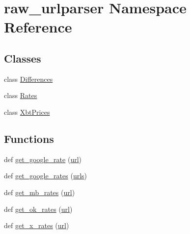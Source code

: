 \hypertarget{namespaceraw__urlparser}{}\section{raw\+\_\+urlparser Namespace Reference}
\label{namespaceraw__urlparser}
\subsection*{Classes}
\begin{DoxyCompactItemize}
\item 
class \hyperlink{classraw__urlparser_1_1_differences}{Differences}
\item 
class \hyperlink{classraw__urlparser_1_1_rates}{Rates}
\item 
class \hyperlink{classraw__urlparser_1_1_xbt_prices}{Xbt\+Prices}
\end{DoxyCompactItemize}
\subsection*{Functions}
\begin{DoxyCompactItemize}
\item 
def \hyperlink{namespaceraw__urlparser_a4faaced9140d84b3f953c21eb1c4a19d}{get\+\_\+google\+\_\+rate} (\hyperlink{namespaceraw__urlparser_a9242b893f4f49ef7cc0d4e599b70daa4}{url})
\item 
def \hyperlink{namespaceraw__urlparser_aa5905f1b040de4865980526ac3c6a16c}{get\+\_\+google\+\_\+rates} (\hyperlink{namespaceraw__urlparser_aded92a1146e1ce1f14fd79a361f947f9}{urls})
\item 
def \hyperlink{namespaceraw__urlparser_ae2341143e866401a993a5a964610f7a6}{get\+\_\+mb\+\_\+rates} (\hyperlink{namespaceraw__urlparser_a9242b893f4f49ef7cc0d4e599b70daa4}{url})
\item 
def \hyperlink{namespaceraw__urlparser_aaf342c097e3df48d46b7296e8177d737}{get\+\_\+ok\+\_\+rates} (\hyperlink{namespaceraw__urlparser_a9242b893f4f49ef7cc0d4e599b70daa4}{url})
\item 
def \hyperlink{namespaceraw__urlparser_ab9602b24afd1ae28d96beb085c37410e}{get\+\_\+x\+\_\+rates} (\hyperlink{namespaceraw__urlparser_a9242b893f4f49ef7cc0d4e599b70daa4}{url})
\end{DoxyCompactItemize}
